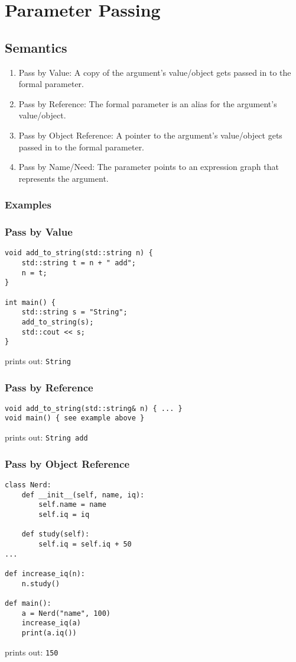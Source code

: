 \documentclass{article}
\begin{document}
\newpage
\section{Parameter Passing}
\subsection{Semantics}
\begin{enumerate}[label=(\roman*)]
\item Pass by Value: A copy of the argument's value/object gets passed
  in to the formal parameter.
\item Pass by Reference: The formal parameter is an alias for the
  argument's value/object.
\item Pass by Object Reference: A pointer to the argument's
  value/object gets passed in to the formal parameter.
\item Pass by Name/Need: The parameter points to an expression graph
  that represents the argument.
\end{enumerate}

\subsubsection{Examples}
\subsubsection*{Pass by Value}
\begin{verbatim}
void add_to_string(std::string n) {
    std::string t = n + " add";
    n = t;
}

int main() {
    std::string s = "String";
    add_to_string(s);
    std::cout << s;
}
\end{verbatim}
prints out: \texttt{String}

\subsubsection*{Pass by Reference}
\begin{verbatim}
void add_to_string(std::string& n) { ... }
void main() { see example above }
\end{verbatim}
prints out: \texttt{String add}

\subsubsection*{Pass by Object Reference}
\begin{verbatim}
class Nerd:
    def __init__(self, name, iq):
        self.name = name
        self.iq = iq

    def study(self):
        self.iq = self.iq + 50
...

def increase_iq(n):
    n.study()

def main():
    a = Nerd("name", 100)
    increase_iq(a)
    print(a.iq())
\end{verbatim}
prints out: \texttt{150}
\end{document}
